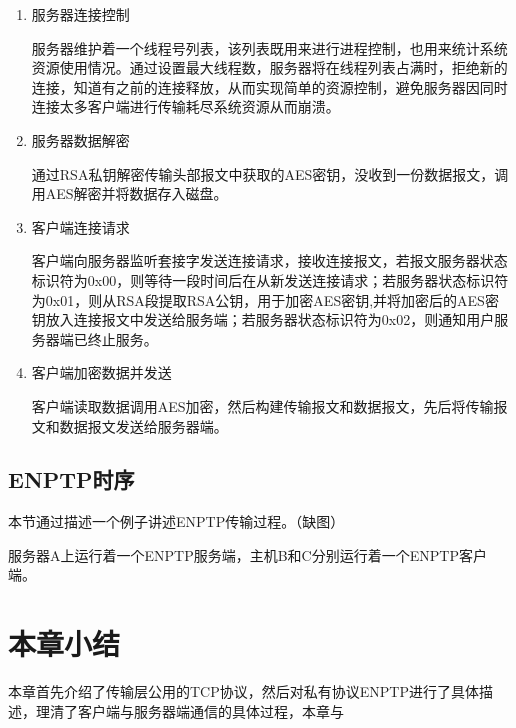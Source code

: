 \begin{enumerate}
\item 服务器连接控制

服务器维护着一个线程号列表，该列表既用来进行进程控制，也用来统计系统资源使用情况。通过设置最大线程数，服务器将在线程列表占满时，拒绝新的连接，知道有之前的连接释放，从而实现简单的资源控制，避免服务器因同时连接太多客户端进行传输耗尽系统资源从而崩溃。
\item 服务器数据解密

通过RSA私钥解密传输头部报文中获取的AES密钥，没收到一份数据报文，调用AES解密并将数据存入磁盘。
\item 客户端连接请求

客户端向服务器监听套接字发送连接请求，接收连接报文，若报文服务器状态标识符为0x00，则等待一段时间后在从新发送连接请求；若服务器状态标识符为0x01，则从RSA段提取RSA公钥，用于加密AES密钥,并将加密后的AES密钥放入连接报文中发送给服务端；若服务器状态标识符为0x02，则通知用户服务器端已终止服务。
\item 客户端加密数据并发送

客户端读取数据调用AES加密，然后构建传输报文和数据报文，先后将传输报文和数据报文发送给服务器端。
\end{enumerate}

\subsection{ENPTP时序}
本节通过描述一个例子讲述ENPTP传输过程。（缺图）

服务器A上运行着一个ENPTP服务端，主机B和C分别运行着一个ENPTP客户端。

\section{本章小结}
本章首先介绍了传输层公用的TCP协议，然后对私有协议ENPTP进行了具体描述，理清了客户端与服务器端通信的具体过程，本章与
